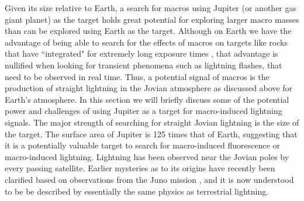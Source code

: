 \documentclass[%
 reprint,
 amsmath,amssymb,
 aps,
]{revtex4-2}
\newcommand{\vtwo}[1]{{\color{black} #1}}
\begin{document}
    Given its size relative to Earth, a search for macros using Jupiter (or another gas giant planet) as the target holds great potential for exploring larger macro masses than can be explored using Earth as the target. \vtwo{Although on Earth we have the advantage of being able to search for the effects of macros on targets like rocks that have ``integrated" for extremely long exposure times \vtwo{\citep{Sidhu2019granite}}, that advantage is nullified when looking for transient phenomena such as lightning flashes, that need to be observed in real time. Thus, a potential signal of macros is the production of straight lightning in the Jovian atmosphere as discussed above for Earth's atmosphere. In this section we will briefly discuss some of the potential power and challenges of using Jupiter as a target for macro-induced lightning signals. The major strength of searching for straight Jovian lightning is the size of the target. The surface area of Jupiter is 125 times that of Earth, suggesting that it is a potentially valuable target to search for macro-induced fluorescence or macro-induced lightning. Lightning has been observed near the Jovian poles by every passing satellite. Earlier mysteries as to its origins have recently been clarified based on observations from the Juno mission \vtwo{\citep{Brown2018}}, and it is now understood to be be described by essentially the same physics as terrestrial lightning.}
\end{document}
